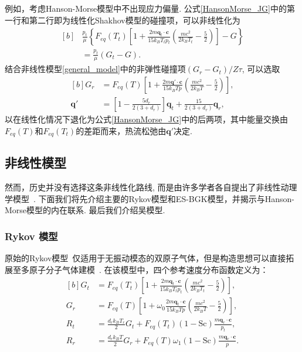 例如，考虑Hanson-Morse模型中不出现应力偏量. 公式\eqref{HansonMorse_JG}中的第一行和第二行即为线性化Shakhov模型的碰撞项，可以非线性化为
\begin{equation}
\begin{aligned}[b]
&\frac{p_t}{\mu} \left\{ F_{eq}(T_t)\left[1+\frac{2m\bm{q}_{t} \cdot \bm{c}}{15k_BT_tp_t}\left(\frac{mc^2}{2k_BT_t}-\frac{5}{2}\right)\right]-G \right\}\\
&=\frac{p_t}{\mu} (G_t-G).
\end{aligned}
\end{equation}
结合非线性模型\eqref{general_model}中的非弹性碰撞项$(G_r-G_t)/Z\tau$, 可以选取
\begin{equation}
\begin{aligned}[b]
G_r&=F_{eq}(T)\left[1+\frac{2m\bm{q}' \cdot \bm{c}} {15k_BTp}\left(\frac{mc^2}{2k_BT}-\frac{5}{2}\right)\right],\\
\bm{q}'&=\left[1-\frac{5d_r}{2(3+d_r)}\right]\bm{q}_{t} +\frac{15}{2(3+d_r)}\bm{q}_{r},
\end{aligned}
\end{equation}
以在线性化情况下退化为公式\eqref{HansonMorse_JG}中的后两项，其中能量交换由$F_{eq}(T)$和$F_{eq}(T_t)$的差距而来，热流松弛由$\bm{q}'$决定.


\subsection{非线性模型}

然而，历史并没有选择这条非线性化路线, 而是由许多学者各自提出了非线性动理学模型~\cite{rykov1978macroscopic,holway1966new,andries2000gaussian, Gorji2011, wu2015kinetic,wang2017unified,Lizhihui2017,Titarev2018,Mathiaud2020}. 下面我们将先介绍主要的Rykov模型和ES-BGK模型，并揭示与Hanson-Morse模型的内在联系. 最后我们介绍吴模型.

\subsubsection{Rykov 模型}

原始的Rykov模型~\cite{rykov1978macroscopic}仅适用于无振动模态的双原子气体，但是构造思想可以直接拓展至多原子分子气体建模~\cite{wu2015kinetic}. 在该模型中，四个参考速度分布函数定义为：
\begin{equation}
\begin{aligned}[b]
G_t&=F_{eq}(T_t)\left[1+\frac{2m\bm{q}_{t} \cdot \bm{c}}{15k_BT_tp_t}\left(\frac{mc^2}{2k_BT_t}-\frac{5}{2}\right)\right],\\
G_r&=F_{eq}(T)\left[1+\omega_0\frac{2m\bm{q}_{t} \cdot \bm{c}} {15k_BTp}\left(\frac{mc^2}{2k_BT}-\frac{5}{2}\right)\right],\\
R_t&=\frac{d_rk_BT_r}{2}G_t+F_{eq}(T_t)(1-\text{Sc})\frac{m\bm{q}_{r} \cdot \bm{c}}{p_t},\\
R_r&=\frac{d_rk_BT}{2}G_r+F_{eq}(T)\omega_1(1-\text{Sc})\frac{m\bm{q}_{r} \cdot \bm{c}}{p}.
\end{aligned}
\end{equation}

